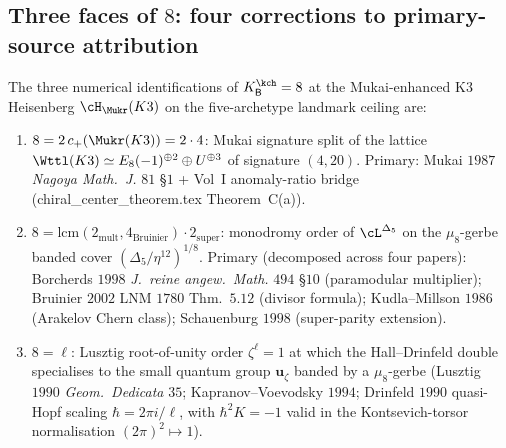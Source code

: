 \subsection{Three faces of $8$: four corrections to primary-source
attribution}
\label{wn:subsec:second-pass-three-faces}

\begin{theorem}
\label{wn:thm:second-pass-three-faces}

The three numerical identifications of $K^{\kch}_{\mathsf{B}} = 8$ at
the Mukai-enhanced K3 Heisenberg $\cH_{\Mukr}(K3)$ on the five-archetype
landmark ceiling are:
\begin{enumerate}[label=(\roman*)]
\item $8 = 2\, c_+(\Mukr(K3)) = 2 \cdot 4$: Mukai signature split of
the lattice $\Wttl(K3) \simeq E_8(-1)^{\oplus 2} \oplus U^{\oplus 3}$
of signature $(4, 20)$. Primary: Mukai $1987$ \emph{Nagoya Math.~J.}
$81$ \S$1$ + Vol~I anomaly-ratio bridge (chiral\_center\_theorem.tex
Theorem~C(a)).
\item $8 = \mathrm{lcm}(2_{\mathrm{mult}}, 4_{\mathrm{Bruinier}})
\cdot 2_{\mathrm{super}}$: monodromy order of
$\cL^{\Delta_5}$ on the $\mu_8$-gerbe banded cover
$(\Delta_5/\eta^{12})^{1/8}$. Primary (decomposed across four papers):
Borcherds $1998$ \emph{J.~reine angew.~Math.} $494$ \S$10$
(paramodular multiplier); Bruinier $2002$ LNM $1780$ Thm.~$5.12$
(divisor formula); Kudla--Millson $1986$ (Arakelov Chern class);
Schauenburg $1998$ (super-parity extension).
\item $8 = \ell$: Lusztig root-of-unity
order $\zeta^{\ell} = 1$ at which the Hall--Drinfeld double specialises
to the small quantum group $\mathbf{u}_{\zeta}$ banded by a
$\mu_8$-gerbe (Lusztig $1990$ \emph{Geom.~Dedicata} $35$;
Kapranov--Voevodsky $1994$; Drinfeld $1990$ quasi-Hopf scaling
$\hbar = 2\pi i / \ell$, with $\hbar^2 K = -1$ valid in the
Kontsevich-torsor normalisation $(2\pi)^2 \mapsto 1$).
\end{enumerate}


\end{theorem}
